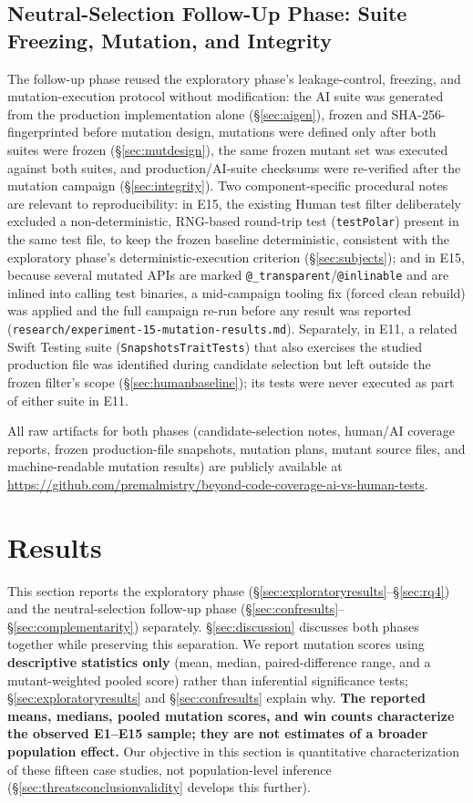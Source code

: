 \documentclass[10pt,conference]{IEEEtran}
\begin{document}
\subsection{Neutral-Selection Follow-Up Phase: Suite Freezing, Mutation, and Integrity}
\label{sec:confintegrity}
The follow-up phase reused the exploratory phase's leakage-control, freezing, and mutation-execution protocol without modification: the AI suite was generated from the production implementation alone (\S\ref{sec:aigen}), frozen and SHA-256-fingerprinted before mutation design, mutations were defined only after both suites were frozen (\S\ref{sec:mutdesign}), the same frozen mutant set was executed against both suites, and production/AI-suite checksums were re-verified after the mutation campaign (\S\ref{sec:integrity}). Two component-specific procedural notes are relevant to reproducibility: in E15, the existing Human test filter deliberately excluded a non-deterministic, RNG-based round-trip test (\texttt{testPolar}) present in the same test file, to keep the frozen baseline deterministic, consistent with the exploratory phase's deterministic-execution criterion (\S\ref{sec:subjects}); and in E15, because several mutated APIs are marked \texttt{@\_transparent}/\texttt{@inlinable} and are inlined into calling test binaries, a mid-campaign tooling fix (forced clean rebuild) was applied and the full campaign re-run before any result was reported (\texttt{research/experiment-15-mutation-results.md}). Separately, in E11, a related Swift Testing suite (\texttt{SnapshotsTraitTests}) that also exercises the studied production file was identified during candidate selection but left outside the frozen filter's scope (\S\ref{sec:humanbaseline}); its tests were never executed as part of either suite in E11.

All raw artifacts for both phases (candidate-selection notes, human/AI coverage reports, frozen production-file snapshots, mutation plans, mutant source files, and machine-readable mutation results) are publicly available at \url{https://github.com/premalmistry/beyond-code-coverage-ai-vs-human-tests}.

\section{Results}
\label{sec:results}

This section reports the exploratory phase (\S\ref{sec:exploratoryresults}--\S\ref{sec:rq4}) and the neutral-selection follow-up phase (\S\ref{sec:confresults}--\S\ref{sec:complementarity}) separately. \S\ref{sec:discussion} discusses both phases together while preserving this separation. We report mutation scores using \textbf{descriptive statistics only} (mean, median, paired-difference range, and a mutant-weighted pooled score) rather than inferential significance tests; \S\ref{sec:exploratoryresults} and \S\ref{sec:confresults} explain why. \textbf{The reported means, medians, pooled mutation scores, and win counts characterize the observed E1--E15 sample; they are not estimates of a broader population effect.} Our objective in this section is quantitative characterization of these fifteen case studies, not population-level inference (\S\ref{sec:threatsconclusionvalidity} develops this further).
\end{document}
